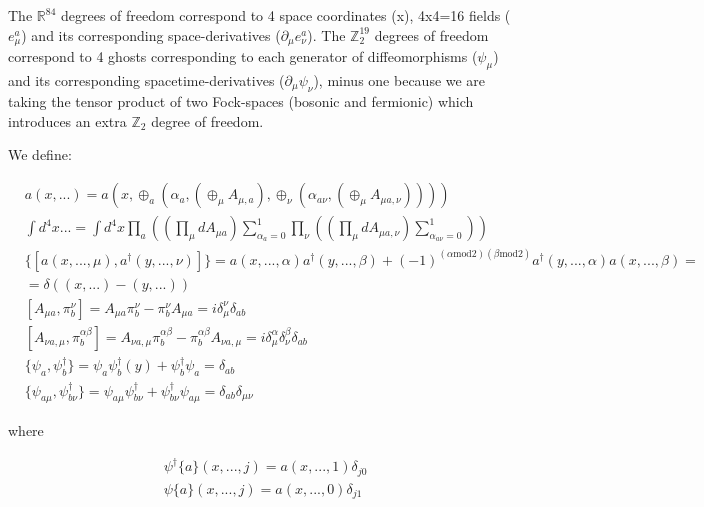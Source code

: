 \documentclass[11pt]{book}
\begin{document}
The \(\mathbb{R}^{84}\) degrees of freedom correspond to 4 space
coordinates (x), 4x4=16 fields (\(e_{\mu}^{a}\)) and its corresponding
space-derivatives (\(\partial_{\mu}e_{\nu}^{a}\)). The
\(\mathbb{Z}_2^{19}\) degrees of freedom correspond to 4 ghosts
corresponding to each generator of diffeomorphisms (\(\psi_{\mu}\)) and
its corresponding spacetime-derivatives (\(\partial_{\mu}\psi_{\nu}\)),
minus one because we are taking the tensor product of two Fock-spaces
(bosonic and fermionic) which introduces an extra \(\mathbb{Z}_2\)
degree of freedom.

We define:

\begin{equation}\begin{aligned}
    & a(x, ...) = a(x,\oplus_{a} (\alpha_{a},(\oplus_{\mu}A_{\mu,a}),\oplus_{\nu}(\alpha_{a \nu},(\oplus_{\mu}A_{\mu a,\nu}))))\\
    & \int d^4 x ... = \int d^4 x \prod_{a}((\prod_{\mu}dA_{\mu a})\sum_{\alpha_{a}=0}^1\prod_{\nu}((\prod_{\mu}d A_{\mu a,\nu})\sum_{\alpha_{a \nu}=0}^1)) \\
 &\{[a(x, ..., \mu),a^\dagger(y, ...,\nu)]\}=a(x, ...,\alpha) a^\dagger(y, ...,\beta)+(-1)^{(\alpha \mathrm{mod} 2)(\beta \mathrm{mod} 2)}a^\dagger(y, ...,\alpha) a(x, ...,\beta)=\\
&=\delta((x,...)-(y,...))\\
    &[A_{\mu a},\pi^{\nu}_{b}]=A_{\mu a}\pi^{\nu}_{b}-\pi^{\nu}_{b} A_{\mu a}= i\delta^{\nu}_{\mu} \delta_{a b}\\
    &[ A_{\nu a,\mu},\pi^{\alpha\beta}_{b}]=A_{\nu a,\mu}\pi^{\alpha \beta}_{b}-\pi^{\alpha\beta}_{b} A_{\nu a,\mu}= i\delta^{\alpha}_{\mu}\delta^{\beta}_{\nu}\delta_{a b}\\
 &\{\psi_{a},\psi^\dagger_{b}\}=\psi_{a} \psi^\dagger_{b}(y)+\psi^\dagger_{b}\psi_{a}=\delta_{a b}\\
&\{\psi_{a \mu},\psi^\dagger_{b \nu}\}=\psi_{a \mu} \psi^\dagger_{b \nu}+\psi^\dagger_{b \nu}\psi_{a \mu}=\delta_{a b}\delta_{\mu \nu}
\end{aligned}\end{equation}

where

\begin{equation}\begin{aligned}
 & \psi^\dagger\{a\}(x, ...,j)= a(x, ...,1) \delta_{j 0}\\
& \psi\{a\}(x, ...,j)=  a(x, ...,0) \delta_{j 1}
\end{aligned}\end{equation}
\end{document}
